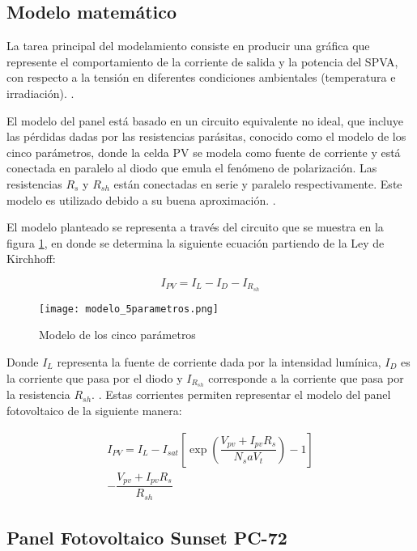 \documentclass[10pt,twocolumn]{article}
\begin{document}
\subsection{Modelo matemático}

La tarea principal del modelamiento consiste en producir una gráfica que represente el comportamiento de la corriente de salida y la potencia del SPVA, con respecto a la tensión en diferentes condiciones ambientales (temperatura e irradiación). \cite{shongwe2015comparative}.

El modelo del panel está basado en un circuito equivalente no ideal, que incluye las pérdidas dadas por las resistencias parásitas, conocido como el modelo de los cinco parámetros, donde la celda PV se modela como fuente de corriente y está conectada en paralelo al diodo que emula el fenómeno de polarización. Las resistencias $R_s$ y $R_{sh}$ están conectadas en serie y paralelo respectivamente. Este modelo es utilizado debido a su buena aproximación. \cite{vera2013maximum}.

El modelo planteado se representa a través del circuito que se muestra en la figura \ref{modelo_5parametros}, en donde se determina la siguiente ecuación partiendo de la Ley de Kirchhoff:

\begin{equation*}
I_{PV} = I_L - I_D - I_{R_{sh}}
\end{equation*}

  \begin{figure}[h]
 	\centering
 	\texttt{[image: modelo\_5parametros.png]}
 	\caption{Modelo de los cinco parámetros}
 	\label{modelo_5parametros}
 \end{figure}

Donde $I_L$ representa la fuente de corriente dada por la intensidad lumínica, $I_D$ es la corriente que pasa por el diodo y $I_{R_{sh}}$ corresponde a la corriente que pasa por la resistencia $R_{sh}$. \cite{riveracontrol}. Estas corrientes permiten representar el modelo del panel fotovoltaico de la siguiente manera:

\begin{multline}
I_{PV} = I_L - I_{sat} \left[ \exp \left( \dfrac{V_{pv} + I_{pv}R_s}{N_s a V_t} \right) - 1 \right] \\
- \dfrac{V_{pv} + I_{pv}R_s}{R_{sh}}
\end{multline}

\subsection{Panel Fotovoltaico Sunset PC-72}
\end{document}
